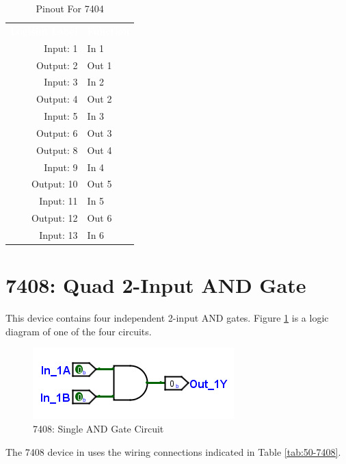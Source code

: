 \begin{table}[H]
	\sffamily
	\newcommand{\head}[1]{\textcolor{white}{\textbf{#1}}}		
	\begin{center}
		\begin{tabular}{rl} 
			\rowcolor{black!75}
			\head{Logisim Label} & \head{Function} \\
			Input: 1   & In 1  \\
			Output: 2  & Out 1  \\
			Input: 3   & In 2 \\
			Output: 4  & Out 2  \\
			Input: 5   & In 3  \\
			Output: 6  & Out 3 \\
			Output: 8  & Out 4  \\
			Input: 9   & In 4  \\
			Output: 10 & Out 5  \\
			Input: 11  & In 5  \\
			Output: 12 & Out 6 \\
			Input: 13  & In 6  \\
		\end{tabular}
	\end{center}
	\caption{Pinout For 7404}
	\label{tab:50-7404}
\end{table}

\section{7408: Quad 2-Input AND Gate}

This device contains four independent 2-input AND gates. Figure \ref{fig:app_ttl-7408} is a logic diagram of one of the four circuits.

\begin{figure}[H]
	\centering
	\includegraphics{gfx/app_ttl-7408}
	\caption{7408: Single AND Gate Circuit}
	\label{fig:app_ttl-7408}
\end{figure}

The 7408 device in \LE uses the wiring connections indicated in Table \ref{tab:50-7408}.

